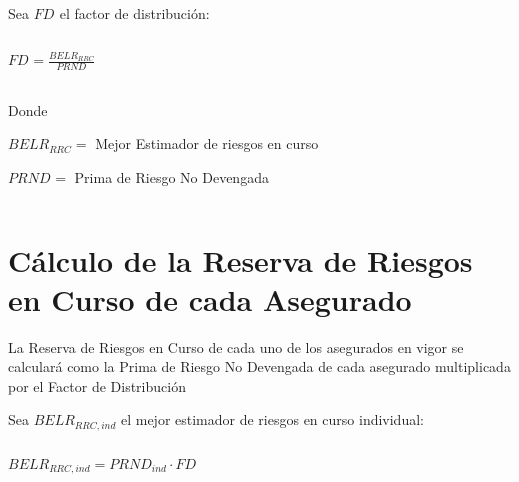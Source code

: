 \documentclass[11pt,twoside,openright,spanish]{report}
\numberwithin{equation}{chapter}
\numberwithin{figure}{chapter}
\numberwithin{table}{chapter}
\begin{document}
	 
	
	Sea $FD_{}$ el factor de distribución:
	
	 

$ $

 
	
		{\centering
		${FD}_{}^{}=\frac{{BELR}_{RRC}^{}}{{PRND}_{}}$
		\noindent
		
	}	
	
	
	 

$ $

 
	
	Donde
	
	 
	
		$BELR_{RRC}=$ Mejor Estimador de riesgos en curso
		
		$PRND_{}=$ Prima de Riesgo No Devengada
		
	 

$ $

 
	
	\section{Cálculo de la Reserva de Riesgos en Curso de cada Asegurado}
	
	 
	
	La Reserva de Riesgos en Curso de cada uno de los asegurados en vigor se calculará como la Prima de Riesgo No Devengada de cada asegurado multiplicada por el Factor de Distribución \begin{comment} y sumando el $BELG_{ADM,ind}$ así como el Margen de Riesgo prorrateado.
	\end{comment}
	 
	
	Sea $BELR_{RRC,ind}$ el mejor estimador de riesgos en curso individual:
	
	 

$ $

 
	
	{\centering	
	\begin{comment}	
		$
		BELR_{RRC,ind}=\begin{cases}
		PRND_{ind}\cdot FD_{}, & \text{$g \neq Salud Dental Individual$}\\
	
		PTND_{ind}\cdot FS_{BEL}^{RRC}, & \text{$g = Salud Dental Individual$}
		\end{cases}
		$
\end{comment}	

	$BELR_{RRC,ind}=PRND_{ind}\cdot FD_{}$	
		\noindent
		
	}
	
\end{document}
